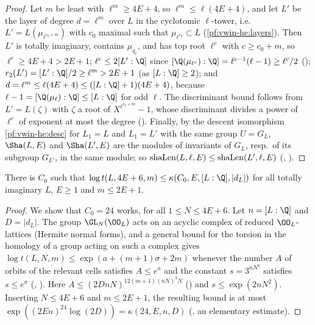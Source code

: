 \begin{proof}
Let $m$ be least with $\ell^m\ge4E+4$, so $\ell^m\le\ell(4E+4)$, and let $L'$ be the layer of degree $d=\ell^m$ over $L$ in the cyclotomic
$\ell$-tower, i.e.\ $L'=L(\mu_{\ell^{c_0+m}})$ with $c_0$ maximal such that $\mu_{\ell^{c_0}}\subset L$ (\cref{pf:vwin-he:layers}). Then $L'$ is
totally imaginary, contains $\mu_{q_\ell}$, and has top root $\ell^c$ with $c\ge c_0+m$, so $\ell^c\ge4E+4>2E+1$; $\ell^c\le2[L':\Q]$
since $[\Q(\mu_{\ell^c}):\Q]=\ell^{c-1}(\ell-1)\ge\ell^c/2$ (); $r_2(L')=[L':\Q]/2\ge\ell^m>2E+1$ (as $[L:\Q]\ge2$);
and $d=\ell^m\le\ell(4E+4)\le([L:\Q]+1)(4E+4)$, because $\ell-1=[\Q(\mu_\ell):\Q]\le[L:\Q]$ for odd $\ell$. The discriminant bound follows
from $L'=L(\zeta)$ with $\zeta$ a root of $X^{\ell^{c_0+m}}-1$, whose discriminant divides a power of $\ell^c$ of exponent at most the degree
(). Finally, by the descent isomorphism \cref{pf:vwin-he:desc} for $L_1=L$ and $L_1=L'$ with the
same group $U=G_L$, $\Sha(L,E)$ and $\Sha(L',E)$ are the modules of invariants of $G_L$, resp.\ of its subgroup $G_{L'}$, in the same module;
so $\mathrm{shaLen}(L,\ell,E)\le\mathrm{shaLen}(L',\ell,E)$ (, ).
\end{proof}

\begin{proposition}\label{pf:vwin:stors}
There is $C_0$ such that $\log t(L,4E+6,m)\le\kappa(C_0,E,[L:\Q],|d_L|)$ for all totally imaginary $L$, $E\ge1$ and $m\le2E+1$.
\end{proposition}

\begin{proof}
We show that $C_0=24$ works, for all $1\le N\le4E+6$. Let $n=[L:\Q]$ and $D=|d_L|$. The group $\GL_N(\OO_L)$ acts on an acyclic
complex of reduced $\OO_L$-lattices (Hermite normal forms), and a general bound for the torsion in the homology of a group acting on such
a complex gives $\log t(L,N,m)\le\exp(a+(m+1)\sigma+2m)$ whenever the number $A$ of orbits of the relevant cells satisfies $A\le e^a$ and
the constant $s=3^{nN^2}$ satisfies $s\le e^\sigma$ (,
). Here $A\le(2DnN)^{12(m+1)(nN)^3N}$ () and
$s\le\exp(2nN^2)$. Inserting $N\le4E+6$ and $m\le2E+1$, the resulting bound is at most $\exp((2En)^{24}\log(2D))=\kappa(24,E,n,D)$
(, an elementary estimate).\end{proof}


